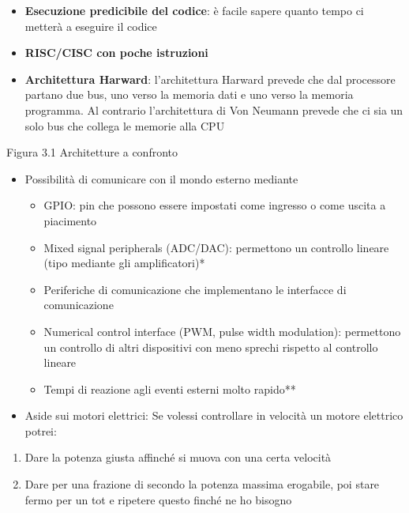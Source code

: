 \documentclass[
]{article}
\providecommand{\tightlist}{%
  \setlength{\itemsep}{0pt}\setlength{\parskip}{0pt}}
\begin{document}
\begin{itemize}
\tightlist
\item
  \textbf{Esecuzione predicibile del codice}: è facile sapere quanto
  tempo ci metterà a eseguire il codice
\item
  \textbf{RISC/CISC con poche istruzioni}
\item
  \textbf{Architettura Harward}: l'architettura Harward prevede che dal
  processore partano due bus, uno verso la memoria dati e uno verso la
  memoria programma. Al contrario l'architettura di Von Neumann prevede
  che ci sia un solo bus che collega le memorie alla CPU
\end{itemize}

Figura 3.1 Architetture a confronto

\begin{itemize}
\tightlist
\item
  Possibilità di comunicare con il mondo esterno mediante

  \begin{itemize}
  \tightlist
  \item
    GPIO: pin che possono essere impostati come ingresso o come uscita a
    piacimento
  \item
    Mixed signal peripherals (ADC/DAC): permettono un controllo lineare
    (tipo mediante gli amplificatori)*
  \item
    Periferiche di comunicazione che implementano le interfacce di
    comunicazione
  \item
    Numerical control interface (PWM, pulse width modulation):
    permettono un controllo di altri dispositivi con meno sprechi
    rispetto al controllo lineare
  \item
    Tempi di reazione agli eventi esterni molto rapido**
  \end{itemize}
\item
  Aside sui motori elettrici: Se volessi controllare in velocità un
  motore elettrico potrei:
\end{itemize}

\begin{enumerate}
\def\labelenumi{\alph{enumi}.}
\tightlist
\item
  Dare la potenza giusta affinché si muova con una certa velocità
\item
  Dare per una frazione di secondo la potenza massima erogabile, poi
  stare fermo per un tot e ripetere questo finché ne ho bisogno
\end{enumerate}
\end{document}
